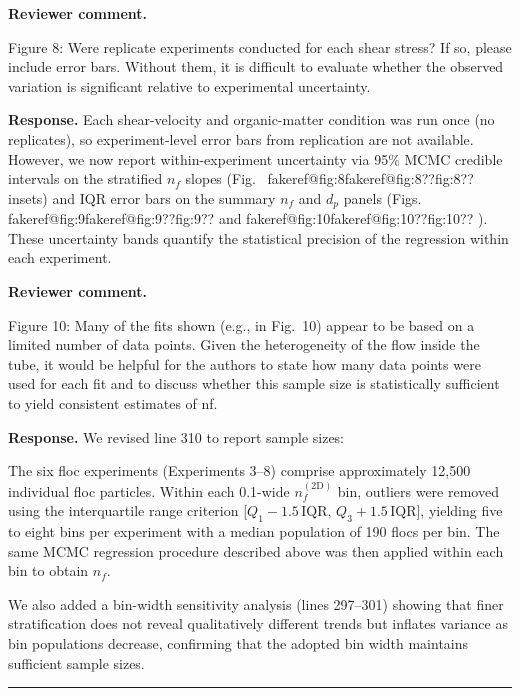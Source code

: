 \documentclass[11pt]{article}
\makeatletter
\newenvironment{Snippet}{%
  \par\vspace{0.3em}\begin{list}{}{\setlength{\leftmargin}{1em}\setlength{\rightmargin}{0.5em}}\item\small\itshape
}{%
  \end{list}\vspace{0.3em}
}
\newcommand{\fakeref}[1]{%
  \ifcsname fakeref@#1\endcsname\csname fakeref@#1\endcsname\else ??#1??\fi
}
\renewcommand{\ref}[1]{\fakeref{#1}}%
\makeatother
\begin{document}
\begin{enumerate}[label=\textbf{R2.\arabic*.}]
\item \textbf{Reviewer comment.}
\begin{Snippet}
Figure 8: Were replicate experiments conducted for each shear stress? If so, please include error bars. Without them, it is difficult to evaluate whether the observed variation is significant relative to experimental uncertainty.
\end{Snippet}
\textbf{Response.} Each shear-velocity and organic-matter condition was run once (no replicates), so experiment-level error bars from replication are not available. However, we now report within-experiment uncertainty via 95\% MCMC credible intervals on the stratified $n_f$ slopes (Fig.~\ref{fig:8} insets) and IQR error bars on the summary $n_f$ and $d_p$ panels (Figs.~\ref{fig:9} and \ref{fig:10}). These uncertainty bands quantify the statistical precision of the regression within each experiment.

\item \textbf{Reviewer comment.}
\begin{Snippet}
Figure 10: Many of the fits shown (e.g., in Fig.\ 10) appear to be based on a limited number of data points. Given the heterogeneity of the flow inside the tube, it would be helpful for the authors to state how many data points were used for each fit and to discuss whether this sample size is statistically sufficient to yield consistent estimates of nf.
\end{Snippet}
\textbf{Response.} We revised line 310 to report sample sizes:
\begin{Snippet}
The six floc experiments (Experiments 3--8) comprise approximately 12{,}500 individual floc particles. Within each 0.1-wide $n_f^{(\mathrm{2D})}$ bin, outliers were removed using the interquartile range criterion [$Q_1 - 1.5\,\mathrm{IQR},\, Q_3 + 1.5\,\mathrm{IQR}$], yielding five to eight bins per experiment with a median population of 190 flocs per bin. The same MCMC regression procedure described above was then applied within each bin to obtain $n_f$.
\end{Snippet}
We also added a bin-width sensitivity analysis (lines 297--301) showing that finer stratification does not reveal qualitatively different trends but inflates variance as bin populations decrease, confirming that the adopted bin width maintains sufficient sample sizes.

\end{enumerate}

\hrule
\vspace{0.8em}
\end{document}
